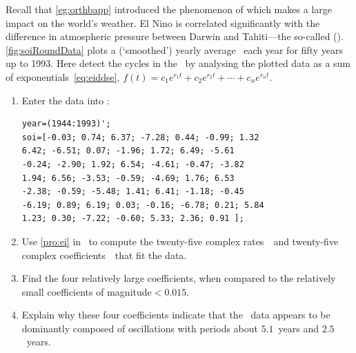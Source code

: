 \begin{exercise} \label{ex:} 
Recall that \autoref{eg:orthbapp} introduced the phenomenon of  which makes a large impact on the world's weather.
El Nino is correlated significantly with the difference in atmospheric pressure between Darwin and Tahiti---the so-called  (\soi).
\autoref{fig:soiRoundData} plots a (`smoothed') yearly average \soi\ each year for fifty years up to 1993.
Here detect the cycles in the \soi\ by analysing the plotted data as a sum of exponentials~\eqref{eq:eiddse}, \(f(t)=c_1e^{r_1t}+c_2e^{r_2t}+\cdots+c_ne^{r_nt}\).
\begin{enumerate}
\item Enter the data into \script:
\setbox\ajrqrbox\hbox{}\marginpar{\usebox{\ajrqrbox}}%
\begin{verbatim}
year=(1944:1993)';
soi=[-0.03; 0.74; 6.37; -7.28; 0.44; -0.99; 1.32
6.42; -6.51; 0.07; -1.96; 1.72; 6.49; -5.61
-0.24; -2.90; 1.92; 6.54; -4.61; -0.47; -3.82
1.94; 6.56; -3.53; -0.59; -4.69; 1.76; 6.53
-2.38; -0.59; -5.48; 1.41; 6.41; -1.18; -0.45
-6.19; 0.89; 6.19; 0.03; -0.16; -6.78; 0.21; 5.84
1.23; 0.30; -7.22; -0.60; 5.33; 2.36; 0.91 ];
\end{verbatim}

\item Use \autoref{pro:ei} in \script\ to compute the twenty-five complex rates~\rv\ and twenty-five complex coefficients~\cv\ that fit the data.

\item Find the four relatively large coefficients, when compared to the relatively small coefficients of magnitude\({}<0.015\).

\item Explain why these four coefficients indicate that the \soi\ data appears to be dominantly composed of oscillations with periods about \(5.1\)~years and \(2.5\)~years.

\end{enumerate}
\end{exercise}
